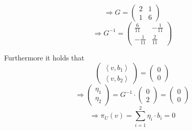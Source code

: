 \documentclass[a4paper]{article}
\theoremstyle{definition}
\newcommand\fun[1]{\left\langle{#1}\right\rangle}
\begin{document}
\[ \Rightarrow G = \begin{pmatrix} 2 & 1 \\ 1 & 6 \end{pmatrix} \]
\[ \Rightarrow G^{-1} = \begin{pmatrix} \frac6{11} & -\frac{1}{11} \\ -\frac{1}{11} & \frac{2}{11} \end{pmatrix} \]

Furthermore it holds that
\[
  \begin{pmatrix}
    \fun{v, b_1} \\
    \fun{v, b_2}
  \end{pmatrix}
  = \begin{pmatrix} 0 \\ 0 \end{pmatrix}
\]
\[ \Rightarrow \begin{pmatrix} \eta_1 \\ \eta_2 \end{pmatrix} = G^{-1} \cdot \begin{pmatrix} 0 \\ 2 \end{pmatrix} = \begin{pmatrix} 0 \\ 0 \end{pmatrix} \]
\[ \Rightarrow \pi_U(v) = \sum_{i=1}^2 \eta_i \cdot b_i = 0 \]
\end{document}
